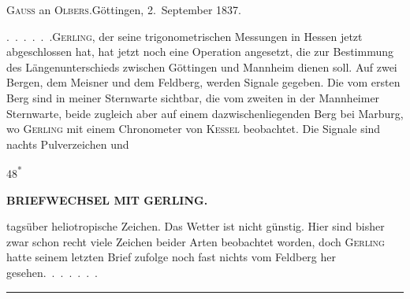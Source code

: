 \begin{center}
\textsc{Gauss} an \textsc{Olbers}.\quad Göttingen, 2.~September 1837.
\end{center}

\par\noindent\hspace*{\parindent}\mbox{.\ .\ .\ .\ .\ .}\quad \textsc{Gerling}, der seine trigonometrischen Messungen in Hessen jetzt abgeschlossen hat, hat jetzt noch eine Operation angesetzt, die zur Bestimmung des Längenunterschieds zwischen Göttingen und Mannheim dienen soll.
Auf zwei Bergen, dem Meisner und dem Feldberg, werden Signale gegeben. Die vom ersten Berg sind in meiner Sternwarte sichtbar, die vom zweiten in der Mannheimer Sternwarte, beide zugleich aber auf einem dazwischenliegenden Berg bei Marburg, wo \textsc{Gerling} mit einem Chronometer von \textsc{Kessel} beobachtet.
Die Signale sind nachts Pulverzeichen und
\par\smallskip\noindent\hfill{\footnotesize 48\textsuperscript{*}}\hspace*{.12\linewidth}\par
\clearpage
\noindent{}\hfill{\small\textbf{BRIEFWECHSEL MIT GERLING.}}\hfill\null\par\medskip
\noindent tagsüber heliotropische Zeichen.
Das Wetter ist nicht günstig. Hier sind bisher zwar schon recht viele Zeichen beider Arten beobachtet worden, doch \textsc{Gerling} hatte seinem letzten Brief zufolge noch fast nichts vom Feldberg her gesehen.\ \mbox{.\ .\ .\ .\ .\ .}

\begin{center}\rule{.24\linewidth}{.4pt}\end{center}
